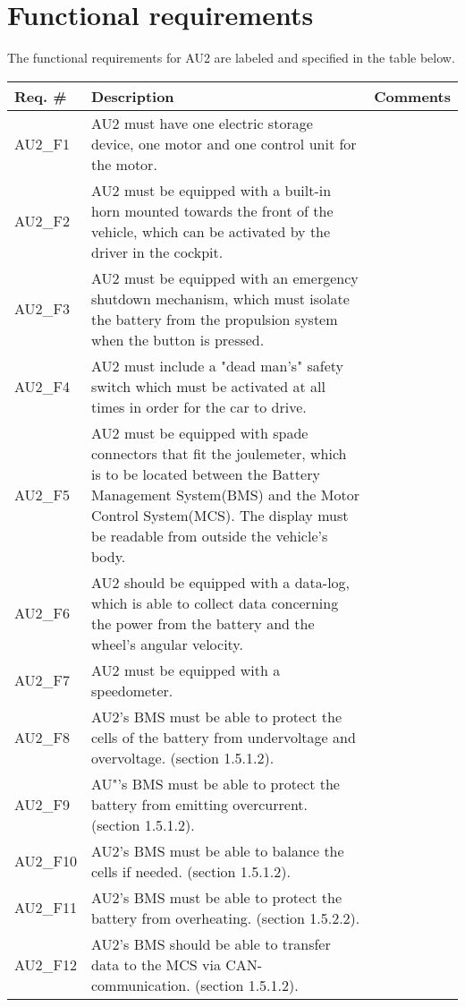 \section{Functional requirements}
The functional requirements for AU2 are labeled and specified in the table below.

\begin{longtable}{|p{2 cm}|p{7 cm}|p{4 cm}|}
		\hline
		\textbf{Req. \#} & \textbf{Description} & \textbf{Comments} \\\hline
		AU2\_F1		& AU2 must have one electric storage device, one motor and one control unit for the motor. &   \\\hline
		AU2\_F2		& AU2 must be equipped with a built-in horn mounted towards the front of the vehicle, which can be activated by the driver in the cockpit. &   \\\hline
		AU2\_F3		& AU2 must be equipped with an emergency shutdown mechanism, which must isolate the battery from the propulsion system when the button is pressed. &   \\\hline
		AU2\_F4		& AU2 must include a "dead man's" safety switch which must be activated at all times in order for the car to drive. &   \\\hline
		AU2\_F5	& AU2 must be equipped with spade connectors that fit the joulemeter\cite{Joulemeter}, which is to be located between the Battery Management System(BMS) and the Motor Control System(MCS). The display must be readable from outside the vehicle's body. &   \\\hline
		AU2\_F6	& AU2 should be equipped with a data-log, which is able to collect data concerning the power from the battery and the wheel's angular velocity. &   \\\hline
		AU2\_F7	& AU2 must be equipped with a speedometer. &   \\\hline
		AU2\_F8	& AU2's BMS must be able to protect the cells of the battery from undervoltage and overvoltage.  \cite{BMSDocumentation} (section 1.5.1.2). &   \\\hline
		AU2\_F9	& AU"'s BMS must be able to protect the battery from emitting overcurrent. \cite{BMSDocumentation} (section 1.5.1.2). &   \\\hline
		AU2\_F10	& AU2's BMS must be able to balance the cells if needed. \cite{BMSDocumentation} (section 1.5.1.2). &   \\\hline
		AU2\_F11	& AU2's BMS must be able to protect the battery from overheating. \cite{BMSDocumentation} (section 1.5.2.2). &   \\\hline
		AU2\_F12	& AU2's BMS should be able to transfer data to the MCS via CAN-communication. \cite{BMSDocumentation} (section 1.5.1.2). &   \\\hline
\end{longtable}